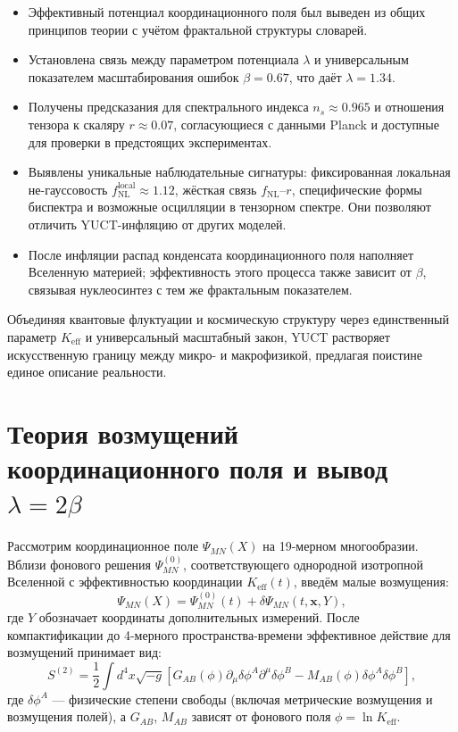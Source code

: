\documentclass[11pt,a4paper]{article}
\newcommand{\Keff}{K_{\mathrm{eff}}}
\begin{document}
	\begin{itemize}
		\item Эффективный потенциал координационного поля был выведен из общих принципов теории с учётом фрактальной структуры словарей.
		\item Установлена связь между параметром потенциала \(\lambda\) и универсальным показателем масштабирования ошибок \(\beta = 0.67\), что даёт \(\lambda = 1.34\).
		\item Получены предсказания для спектрального индекса \(n_s \approx 0.965\) и отношения тензора к скаляру \(r \approx 0.07\), согласующиеся с данными Planck и доступные для проверки в предстоящих экспериментах.
		\item Выявлены уникальные наблюдательные сигнатуры: фиксированная локальная не-гауссовость \(f_{\text{NL}}^{\text{local}} \approx 1.12\), жёсткая связь \(f_{\text{NL}}\)–\(r\), специфические формы биспектра и возможные осцилляции в тензорном спектре. Они позволяют отличить YUCT-инфляцию от других моделей.
		\item После инфляции распад конденсата координационного поля наполняет Вселенную материей; эффективность этого процесса также зависит от \(\beta\), связывая нуклеосинтез с тем же фрактальным показателем.
	\end{itemize}
	
	Объединяя квантовые флуктуации и космическую структуру через единственный параметр \(K_{\mathrm{eff}}\) и универсальный масштабный закон, YUCT растворяет искусственную границу между микро- и макрофизикой, предлагая поистине единое описание реальности.
	
	\appendix
	\section{Теория возмущений координационного поля и вывод \(\lambda = 2\beta\)}
	\label{app:perturbations}
	
	Рассмотрим координационное поле \(\Psi_{MN}(X)\) на 19-мерном многообразии. Вблизи фонового решения \(\Psi^{(0)}_{MN}\), соответствующего однородной изотропной Вселенной с эффективностью координации \(\Keff(t)\), введём малые возмущения:
	\begin{equation}
		\Psi_{MN}(X) = \Psi^{(0)}_{MN}(t) + \delta\Psi_{MN}(t,\mathbf{x},Y),
	\end{equation}
	где \(Y\) обозначает координаты дополнительных измерений. После компактификации до 4-мерного пространства-времени эффективное действие для возмущений принимает вид:
	\begin{equation}
		S^{(2)} = \frac{1}{2} \int d^4x \sqrt{-g} \left[ G_{AB}(\phi) \partial_\mu \delta\phi^A \partial^\mu \delta\phi^B - M_{AB}(\phi) \delta\phi^A \delta\phi^B \right],
	\end{equation}
	где \(\delta\phi^A\) — физические степени свободы (включая метрические возмущения и возмущения полей), а \(G_{AB}\), \(M_{AB}\) зависят от фонового поля \(\phi = \ln\Keff\).
	
\end{document}
